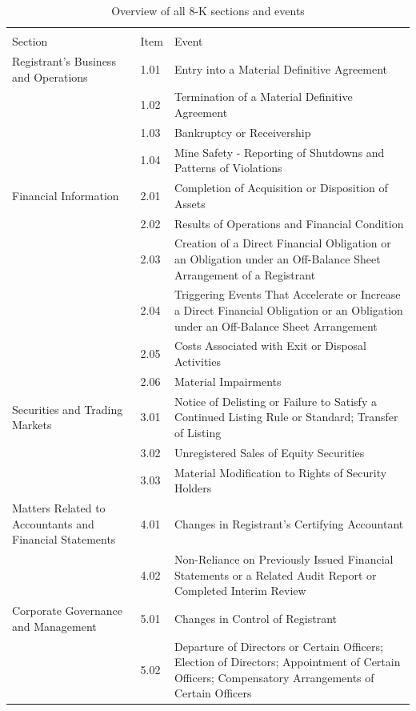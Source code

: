 \documentclass{article}
\begin{document}
	
	
	
	
	\begin{table}[h!]
	\centering
	\caption{Overview of all 8-K sections and events}
	\label{table:8kevents}
	
	\begin{tabularx}{\textwidth}{|X|l|X|}
		\toprule
		&      &                                   \\
		Section & Item & Event \\
		\midrule
		Registrant's Business and Operations & 1.01 & Entry into a Material Definitive Agreement \\
		& 1.02 & Termination of a Material Definitive Agreement \\
		& 1.03 & Bankruptcy or Receivership \\
		& 1.04 & Mine Safety - Reporting of Shutdowns and Patterns of Violations \\
		Financial Information & 2.01 & Completion of Acquisition or Disposition of Assets \\
		& 2.02 & Results of Operations and Financial Condition \\
		& 2.03 & Creation of a Direct Financial Obligation or an Obligation under an Off-Balance Sheet Arrangement of a Registrant \\
		& 2.04 & Triggering Events That Accelerate or Increase a Direct Financial Obligation or an Obligation under an Off-Balance Sheet Arrangement \\
		& 2.05 & Costs Associated with Exit or Disposal Activities \\
		& 2.06 & Material Impairments \\
		Securities and Trading Markets & 3.01 & Notice of Delisting or Failure to Satisfy a Continued Listing Rule or Standard; Transfer of Listing \\
		& 3.02 & Unregistered Sales of Equity Securities \\
		& 3.03 & Material Modification to Rights of Security Holders \\
		Matters Related to Accountants and Financial Statements & 4.01 & Changes in Registrant's Certifying Accountant \\
		& 4.02 & Non-Reliance on Previously Issued Financial Statements or a Related Audit Report or Completed Interim Review \\
		Corporate Governance and Management & 5.01 & Changes in Control of Registrant \\
		& 5.02 & Departure of Directors or Certain Officers; Election of Directors; Appointment of Certain Officers; Compensatory Arrangements of Certain Officers \\

\end{tabularx}
\end{table}
\end{document}

